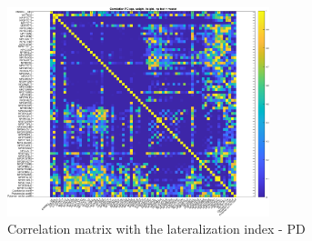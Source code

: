 \documentclass[]{article}
\begin{document}
\begin{figure}[h]
	\centering
	\includegraphics[width=3in]{../correlation_matrix_pd}
	\caption{Correlation matrix with the lateralization index - PD}
	\label{fig:corr_mat_pd}
	
\end{figure} 
\end{document}

